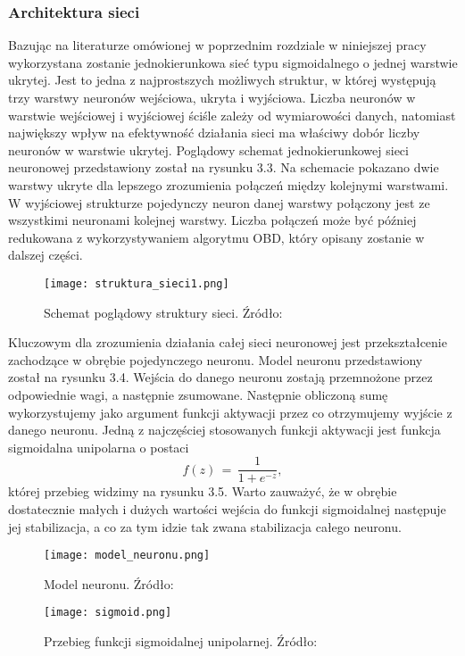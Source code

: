 \subsubsection{Architektura sieci}
Bazując na literaturze omówionej w poprzednim rozdziale w niniejszej pracy wykorzystana zostanie jednokierunkowa sieć typu sigmoidalnego o jednej warstwie ukrytej. Jest to jedna z najprostszych możliwych struktur, w której występują trzy warstwy neuronów wejściowa, ukryta i wyjściowa. Liczba neuronów w warstwie wejściowej i wyjściowej ściśle zależy od wymiarowości danych, natomiast największy wpływ na efektywność działania sieci ma właściwy dobór liczby neuronów w warstwie ukrytej. Poglądowy schemat jednokierunkowej sieci neuronowej przedstawiony został na rysunku 3.3. Na schemacie pokazano dwie warstwy ukryte dla lepszego zrozumienia połączeń między kolejnymi warstwami. W wyjściowej strukturze pojedynczy neuron danej warstwy połączony jest ze wszystkimi neuronami kolejnej warstwy. Liczba połączeń może być później redukowana z wykorzystywaniem algorytmu OBD, który opisany zostanie w dalszej części. 
\begin{figure}[!h]
    \label{fig:struktura-sieci}
    \centering \texttt{[image: struktura\_sieci1.png]}
    \caption{Schemat poglądowy struktury sieci. Źródło: \cite{nielsen2015} }
\end{figure}

\par Kluczowym dla zrozumienia działania całej sieci neuronowej jest przekształcenie zachodzące w obrębie pojedynczego neuronu. Model neuronu przedstawiony został na rysunku 3.4. Wejścia do danego neuronu zostają przemnożone przez odpowiednie wagi, a następnie zsumowane. Następnie obliczoną sumę wykorzystujemy jako argument funkcji aktywacji przez co otrzymujemy wyjście z danego neuronu. Jedną z najczęściej stosowanych funkcji aktywacji jest funkcja sigmoidalna unipolarna o postaci 
\begin{equation}
f(z) \, = \, \frac{1}{1+e^{-z}}, 
\end{equation}
której przebieg widzimy na rysunku 3.5. Warto zauważyć, że w obrębie dostatecznie małych i dużych wartości wejścia do funkcji sigmoidalnej następuje jej stabilizacja, a co za tym idzie tak zwana stabilizacja całego neuronu.
\begin{figure}[!h]
    \label{fig:struktura-sieci}
    \centering \texttt{[image: model\_neuronu.png]}
    \caption{Model neuronu. Źródło: \cite{wawrzynski2019} }
\end{figure}
\begin{figure}[!h]
    \label{fig:sigmoid}
    \centering \texttt{[image: sigmoid.png]}
    \caption{Przebieg funkcji sigmoidalnej unipolarnej. Źródło: \cite{nielsen2015}}
\end{figure}

